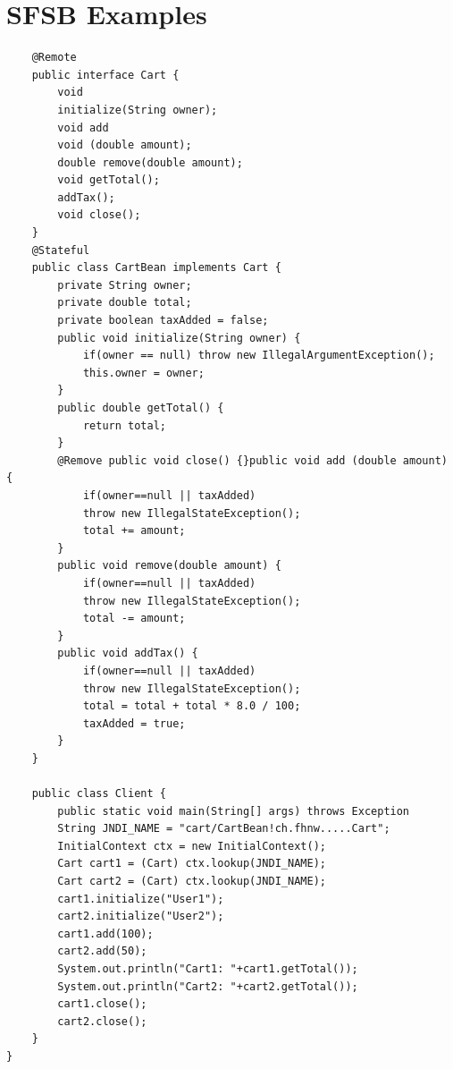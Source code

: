 \documentclass[a4paper,10pt]{scrreprt}
\begin{document}
\section{SFSB Examples}
\begin{lstlisting}
	@Remote
	public interface Cart {
		void
		initialize(String owner);
		void add
		void (double amount);
		double remove(double amount);
		void getTotal();
		addTax();
		void close();
	}
	@Stateful
	public class CartBean implements Cart {
		private String owner;
		private double total;
		private boolean taxAdded = false;
		public void initialize(String owner) {
			if(owner == null) throw new IllegalArgumentException();
			this.owner = owner;
		}
		public double getTotal() {
			return total;
		}
		@Remove public void close() {}public void add (double amount) {
			if(owner==null || taxAdded)
			throw new IllegalStateException();
			total += amount;
		}
		public void remove(double amount) {
			if(owner==null || taxAdded)
			throw new IllegalStateException();
			total -= amount;
		}
		public void addTax() {
			if(owner==null || taxAdded)
			throw new IllegalStateException();
			total = total + total * 8.0 / 100;
			taxAdded = true;
		}
	}

	public class Client {
		public static void main(String[] args) throws Exception
		String JNDI_NAME = "cart/CartBean!ch.fhnw.....Cart";
		InitialContext ctx = new InitialContext();
		Cart cart1 = (Cart) ctx.lookup(JNDI_NAME);
		Cart cart2 = (Cart) ctx.lookup(JNDI_NAME);
		cart1.initialize("User1");
		cart2.initialize("User2");
		cart1.add(100);
		cart2.add(50);
		System.out.println("Cart1: "+cart1.getTotal());
		System.out.println("Cart2: "+cart2.getTotal());
		cart1.close();
		cart2.close();
	}
}



\end{lstlisting}
\end{document}
